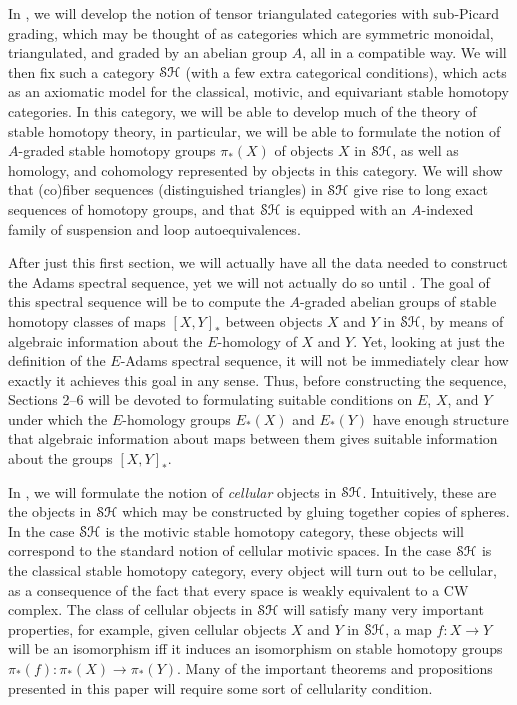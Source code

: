 \documentclass[../main.tex]{subfiles}
\begin{document}
In , we will develop the notion of tensor triangulated categories with sub-Picard grading, which may be thought of as categories which are symmetric monoidal, triangulated, and graded by an abelian group $A$, all in a compatible way. We will then fix such a category $\mathcal{SH}$ (with a few extra categorical conditions), which acts as an axiomatic model for the classical, motivic, and equivariant stable homotopy categories. In this category, we will be able to develop much of the theory of stable homotopy theory, in particular, we will be able to formulate the notion of $A$-graded stable homotopy groups $\pi_*(X)$ of objects $X$ in $\mathcal{SH}$, as well as homology, and cohomology represented by objects in this category. We will show that (co)fiber sequences (distinguished triangles) in $\mathcal{SH}$ give rise to long exact sequences of homotopy groups, and that $\mathcal{SH}$ is equipped with an $A$-indexed family of suspension and loop autoequivalences.

After just this first section, we will actually have all the data needed to construct the Adams spectral sequence, yet we will not actually do so until . The goal of this spectral sequence will be to compute the $A$-graded abelian groups of stable homotopy classes of maps ${[X,Y]}_*$ between objects $X$ and $Y$ in $\mathcal{SH}$, by means of algebraic information about the $E$-homology of $X$ and $Y$. Yet, looking at just the definition of the $E$-Adams spectral sequence, it will not be immediately clear how exactly it achieves this goal in any sense. Thus, before constructing the sequence, Sections 2--6 will be devoted to formulating suitable conditions on $E$, $X$, and $Y$ under which the $E$-homology groups $E_*(X)$ and $E_*(Y)$ have enough structure that algebraic information about maps between them gives suitable information about the groups ${[X,Y]}_*$.

In , we will formulate the notion of \emph{cellular} objects in $\mathcal{SH}$. Intuitively, these are the objects in $\mathcal{SH}$ which may be constructed by gluing together copies of spheres. In the case $\mathcal{SH}$ is the motivic stable homotopy category, these objects will correspond to the standard notion of cellular motivic spaces. In the case $\mathcal{SH}$ is the classical stable homotopy category, every object will turn out to be cellular, as a consequence of the fact that every space is weakly equivalent to a CW complex. The class of cellular objects in $\mathcal{SH}$ will satisfy many very important properties, for example, given cellular objects $X$ and $Y$ in $\mathcal{SH}$, a map $f:X\to Y$ will be an isomorphism iff it induces an isomorphism on stable homotopy groups $\pi_*(f):\pi_*(X)\to\pi_*(Y)$. Many of the important theorems and propositions presented in this paper will require some sort of cellularity condition.
\end{document}
